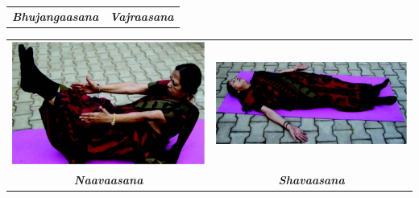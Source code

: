 \begin{center}
\begin{tabular}{@{}cc@{}}
{\textbf{\textit{Bhujangaasana}}} &
{\textbf{\textit{Vajraasana}}}\\
\end{tabular}
\end{center}


\begin{center}
\begin{tabular}{@{}cc@{}}
\includegraphics[scale=.9]{images/094.jpg} &
\includegraphics[scale=1.3]{images/095.jpg}\\
{\textbf{\textit{Naavaasana}}} &
{\textbf{\textit{Shavaasana}}}\\
\end{tabular}
\end{center}




